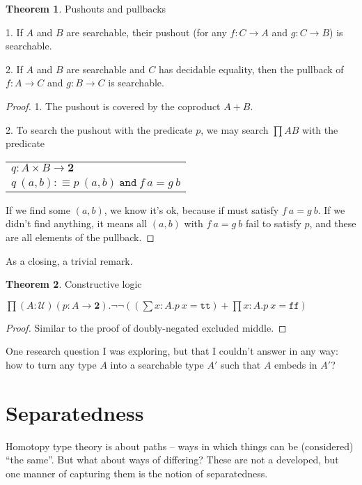 \documentclass[11pt]{article}
\theoremstyle{definition}
\newtheorem{theorem}{Theorem}[section]
\newcommand{\txt}[1]{\texttt{#1}}
\renewcommand{\(}{\left(}
\renewcommand{\)}{\right)}
\newcommand{\defn}{:\equiv}
\newcommand{\U}{\mathcal{U}}
\newcommand{\apl}[2]{#1\ #2}
\newcommand{\Bool}{\mathbf{2}}
\newcommand{\true}{\txt{tt}}
\newcommand{\false}{\txt{ff}}
\newcommand{\dprod}[2]{\prod #1.#2}
\newcommand{\dsum}[2]{\sum #1.#2}
\newcommand{\prodt}[2]{#1 \times #2}
\begin{document}
\begin{theorem} Pushouts and pullbacks

1. If $A$ and $B$ are searchable, their pushout (for any $f : C \to A$ and $g : C \to B$) is searchable.

2. If $A$ and $B$ are searchable and $C$ has decidable equality, then the pullback of $f: A \to C$ and $g : B \to C$ is searchable.
\end{theorem}
\begin{proof}

1. The pushout is covered by the coproduct $A + B$.

2. To search the pushout with the predicate $p$, we may search $\prod{A}{B}$ with the predicate

\begin{center}
\begin{tabular}{l}
$q : \prodt{A}{B} \to \Bool$ \\
$\apl{q}{(a, b)} \defn \apl{p}{(a, b)}\ \txt{and}\ \apl{f}{a} = \apl{g}{b}$
\end{tabular}
\end{center}

If we find some $(a, b)$, we know it's ok, because if must satisfy $\apl{f}{a} = \apl{g}{b}$. If we didn't find anything, it means all $(a, b)$ with $\apl{f}{a} = \apl{g}{b}$ fail to satisfy $p$, and these are all elements of the pullback.

\end{proof}

As a closing, a trivial remark.

\begin{theorem} Constructive logic

$\dprod{(A : \U)(p : A \to \Bool)}{\neg\neg \(\(\dsum{x : A}{\apl{p}{x} = \true}\) + \dprod{x : A}{\apl{p}{x} = \false}\)}$

\end{theorem}
\begin{proof}
Similar to the proof of doubly-negated excluded middle.
\end{proof}

One research question I was exploring, but that I couldn't answer in any way: how to turn any type $A$ into a searchable type $A'$ such that $A$ embeds in $A'$?

\section{Separatedness}

Homotopy type theory is about paths -- ways in which things can be (considered) ``the same''. But what about ways of differing? These are not a developed, but one manner of capturing them is the notion of separatedness.
\end{document}
